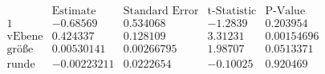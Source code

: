 \[\begin{array}{l|llll}
 \text{} & \text{Estimate} & \text{Standard Error} & \text{t-Statistic} & \text{P-Value} \\
\hline
 1 & -0.68569 & 0.534068 & -1.2839 & 0.203954 \\
 \text{vEbene} & 0.424337 & 0.128109 & 3.31231 & 0.00154696 \\
 \text{gr{\" o}{\ss}e} & 0.00530141 & 0.00266795 & 1.98707 & 0.0513371 \\
 \text{runde} & -0.00223211 & 0.0222654 & -0.10025 & 0.920469 \\
\end{array}\]

